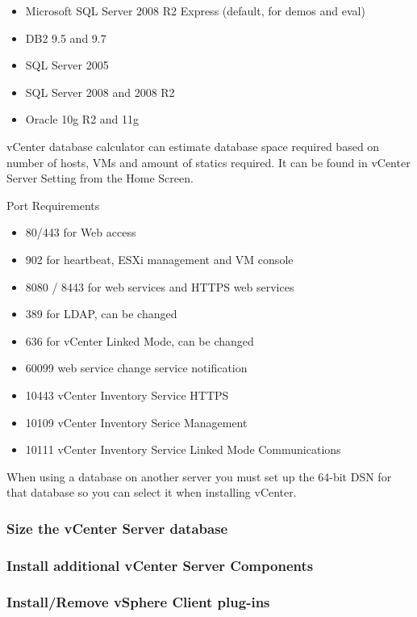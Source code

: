 \begin{itemize}
\item Microsoft SQL Server 2008 R2 Express (default, for demos and eval)
\item DB2 9.5 and 9.7
\item SQL Server 2005
\item SQL Server 2008 and 2008 R2
\item Oracle 10g R2 and 11g
\end{itemize}

vCenter database calculator can estimate database space required based on
number of hosts, VMs and amount of statics required. It can be found in vCenter
Server Setting from the Home Screen.

Port Requirements

\begin{itemize}
\item 80/443 for Web access
\item 902 for heartbeat, ESXi management and VM console
\item 8080 / 8443 for web services and HTTPS web services
\item 389 for LDAP, can be changed
\item 636 for vCenter Linked Mode, can be changed
\item 60099 web service change service notification
\item 10443 vCenter Inventory Service HTTPS
\item 10109 vCenter Inventory Serice Management
\item 10111 vCenter Inventory Service Linked Mode Communications
\end{itemize}

When using a database on another server you must set up the 64-bit DSN for that database so you
can select it when installing vCenter.

\subsubsection{Size the vCenter Server database}

\subsubsection{Install additional vCenter Server Components}

\subsubsection{Install/Remove vSphere Client plug-ins}

